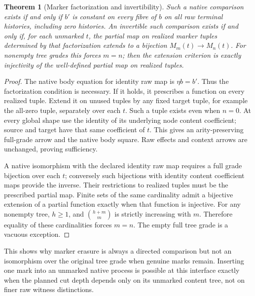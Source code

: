 \documentclass{article}
\newtheorem{theorem}{Theorem}\newtheorem{proposition}[theorem]{Proposition}
\begin{document}
\begin{theorem}[Marker factorization and invertibility]
Such a native comparison exists if and only if $b'$ is constant on every
fibre of $b$ on \emph{all} raw terminal histories, including zero histories.
An invertible such comparison exists if and only if, for each unmarked $t$, the partial map on
realized marker tuples determined by that factorization extends to a
bijection $M_m(t)\to M_n(t)$. For nonempty tree grades this forces $m=n$;
then the extension criterion is exactly injectivity of the well-defined
partial map on realized tuples.
\end{theorem}
\begin{proof}
The native body equation for identity raw map is $\eta b=b'$. Thus the
factorization condition is necessary. If it holds, it prescribes a function
on every realized tuple. Extend it on unused tuples by any fixed target tuple,
for example the all-zero tuple, separately over each $t$. Such a tuple exists
even when $n=0$. At every global shape use the identity of its underlying
node content coefficient; source and target have that same coefficient of
$t$. This gives an arity-preserving full-grade arrow and the native body
square. Raw effects and context arrows are unchanged, proving sufficiency.

A native isomorphism with the declared identity raw map requires a full grade
bijection over each $t$; conversely such bijections with identity content
coefficient maps provide the inverse. Their restrictions to realized tuples
must be the prescribed partial map. Finite sets of the same cardinality admit
a bijective extension of a partial function exactly when that function is
injective. For any nonempty tree, $h\geq1$, and
$\binom{h+m}{m}$ is strictly increasing with $m$. Therefore equality of these
cardinalities forces $m=n$. The empty full tree grade is a vacuous exception.
\end{proof}
This shows why marker erasure is always a directed comparison but not an
isomorphism over the original tree grade when genuine marks remain. Inserting
one mark into an unmarked native process is possible at this interface exactly
when the planned cut depth depends only on its unmarked content tree, not on
finer raw witness distinctions.
\end{document}
